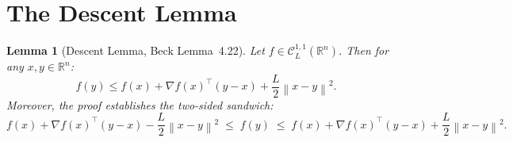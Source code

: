 \documentclass[11pt]{article}
\theoremstyle{definition}
\theoremstyle{plain}
\newtheorem{lemma}{Lemma}
\newcommand{\R}{\mathbb{R}}
\newcommand{\norm}[1]{\left\|#1\right\|}
\newcommand{\grad}{\nabla}
\begin{document}
\section{The Descent Lemma}

\begin{lemma}[Descent Lemma, Beck Lemma~4.22]\label{lem:descent}
Let $f\in\mathcal{C}^{1,1}_L(\R^n)$. Then for any $x,y\in\R^n$:
\begin{equation}\label{eq:descent_upper}
  f(y) \leq f(x) + \grad f(x)^\top(y-x) + \frac{L}{2}\norm{x-y}^2.
\end{equation}
Moreover, the proof establishes the two-sided sandwich:
\begin{equation}\label{eq:descent_sandwich}
  f(x) + \grad f(x)^\top(y-x) - \frac{L}{2}\norm{x-y}^2
  \;\leq\; f(y)
  \;\leq\; f(x) + \grad f(x)^\top(y-x) + \frac{L}{2}\norm{x-y}^2.
\end{equation}
\end{lemma}
\end{document}
